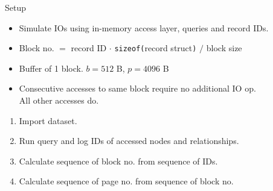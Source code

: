 \documentclass[rgb]{beamer}
\begin{document}
\begin{frame}[allowframebreaks]{Setup}
            \begin{itemize}
            \item Simulate IOs using in-memory access layer, queries and record IDs. \\ [1em]
            \item Block no. $=$ record ID $\cdot$ \texttt{sizeof(}record struct\texttt{)} $/$ block size \\  [1em]
            \item Buffer of 1 block. $b = 512$ B, $p = 4096$ B \\ [1em]
            \item Consecutive accesses to same block require no additional IO op. \\ All other accesses do. \\ [2em]
            \end{itemize}
            \begin{enumerate}
                \item Import dataset.
                \item Run query and log IDs of accessed nodes and relationships.
                \item Calculate sequence of block no. from sequence of IDs.
                \item Calculate sequence of page no. from sequence of block no.
               \end{enumerate}
        \end{frame}
        
\end{document}
